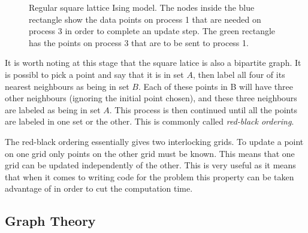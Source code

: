 \documentclass[pdftex,12pt,a4paper]{article}
\begin{document}
\begin{figure}
\begin{center}
\caption{Regular square lattice Ising model. The nodes inside the blue rectangle show the data points on process 1 that are needed on process 3 in order to complete an update step. The green rectangle has the points on process 3 that are to be sent to process 1.}
\end{center}
\end{figure}

It is worth noting at this stage that the square latice is also a bipartite graph. It is possibl to pick a point and say that it is in set $A$, then label all four of its nearest neighbours as being in set $B$. Each of these points in B will have three other neighbours (ignoring the initial point chosen), and these three neighbours are labeled as being in set $A$. This process is then continued until all the points are labeled in one set or the other. This is commonly called \emph{red-black ordering}.

The red-black ordering essentially gives two interlocking grids. To update a point on one grid only points on the other grid must be known. This means that one grid can be updated independently of the other. This is very useful as it means that when it comes to writing code for the problem this property can be taken advantage of in order to cut the computation time.



\subsection{Graph Theory}
\end{document}
